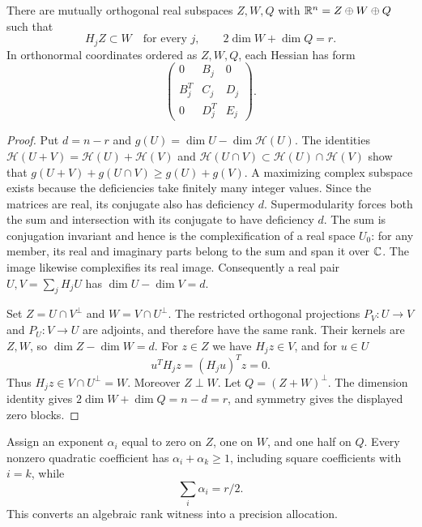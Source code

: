 \begin{lemma}\label{lem:symmetric-shrink}
There are mutually orthogonal real subspaces $Z,W,Q$ with
$\mathbb R^n=Z\oplus W\oplus Q$ such that
\begin{equation}\label{eq:shrinking-blocks}
 H_j Z\subset W\quad\text{for every }j,
 \qquad 2\dim W+\dim Q=r.
\end{equation}
In orthonormal coordinates ordered as $Z,W,Q$, each Hessian has form
\begin{equation}\label{eq:block-pattern}
 \begin{pmatrix}
 0&B_j&0\\ B_j^T&C_j&D_j\\0&D_j^T&E_j
 \end{pmatrix}.
\end{equation}
\end{lemma}
\begin{proof}
Put $d=n-r$ and $g(U)=\dim U-\dim\mathcal H(U)$. The identities
$\mathcal H(U+V)=\mathcal H(U)+\mathcal H(V)$ and
$\mathcal H(U\cap V)\subset\mathcal H(U)\cap\mathcal H(V)$ show that
$g(U+V)+g(U\cap V)\ge g(U)+g(V)$. A maximizing complex subspace exists
because the deficiencies take finitely many integer values. Since the
matrices are real, its conjugate also has deficiency $d$.
Supermodularity forces both the sum and intersection with its conjugate
to have deficiency $d$. The sum is conjugation invariant and hence is
the complexification of a real space $U_0$: for any member, its real
and imaginary parts belong to the sum and span it over $\mathbb C$.
The image likewise complexifies its real image. Consequently a real
pair $U,V=\sum_jH_jU$ has $\dim U-\dim V=d$.

Set $Z=U\cap V^\perp$ and $W=V\cap U^\perp$. The restricted orthogonal
projections $P_V:U\to V$ and $P_U:V\to U$ are adjoints, and therefore
have the same rank. Their kernels are $Z,W$, so
$\dim Z-\dim W=d$. For $z\in Z$ we have $H_jz\in V$, and for $u\in U$
\[
 u^TH_jz=(H_ju)^Tz=0.
\]
Thus $H_jz\in V\cap U^\perp=W$. Moreover $Z\perp W$.
Let $Q=(Z+W)^\perp$. The dimension identity gives
$2\dim W+\dim Q=n-d=r$, and symmetry gives the displayed zero blocks.
\end{proof}

Assign an exponent $\alpha_i$ equal to zero on $Z$, one on $W$, and
one half on $Q$. Every nonzero quadratic coefficient has
$\alpha_i+\alpha_k\ge1$, including square coefficients with $i=k$,
while
\begin{equation}\label{eq:exponent-sum}
 \sum_i\alpha_i=r/2.
\end{equation}
This converts an algebraic rank witness into a precision allocation.

